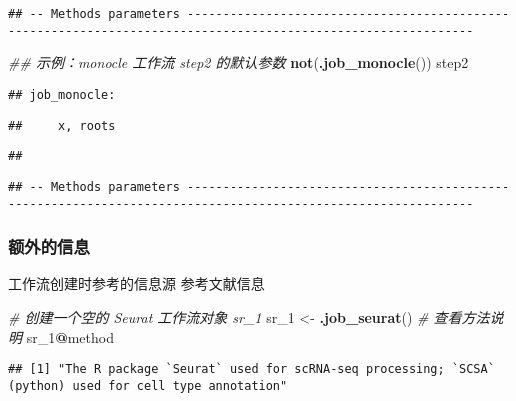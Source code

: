 \documentclass[
]{article}
\newenvironment{Shaded}{\begin{snugshade}}{\end{snugshade}}
\newcommand{\CommentTok}[1]{\textcolor[rgb]{0.56,0.35,0.01}{\textit{#1}}}
\newcommand{\DecValTok}[1]{\textcolor[rgb]{0.00,0.00,0.81}{#1}}
\newcommand{\KeywordTok}[1]{\textcolor[rgb]{0.13,0.29,0.53}{\textbf{#1}}}
\newcommand{\NormalTok}[1]{#1}
\newcommand{\OperatorTok}[1]{\textcolor[rgb]{0.81,0.36,0.00}{\textbf{#1}}}
\newcommand{\StringTok}[1]{\textcolor[rgb]{0.31,0.60,0.02}{#1}}
\begin{document}
\begin{verbatim}
## -- Methods parameters --------------------------------------------------------------------------------------------------------------
\end{verbatim}

\begin{Shaded}
\begin{Highlighting}[]
\CommentTok{\#\# 示例：monocle 工作流 step2 的默认参数}
\KeywordTok{not}\NormalTok{(}\KeywordTok{.job\_monocle}\NormalTok{())}
\NormalTok{step2}
\end{Highlighting}
\end{Shaded}

\begin{verbatim}
## job_monocle:
\end{verbatim}

\begin{verbatim}
##     x, roots
\end{verbatim}

\begin{verbatim}
## 
\end{verbatim}

\begin{verbatim}
## -- Methods parameters --------------------------------------------------------------------------------------------------------------
\end{verbatim}

\hypertarget{ux989dux5916ux7684ux4fe1ux606f}{%
\subsubsection{额外的信息}\label{ux989dux5916ux7684ux4fe1ux606f}}

工作流创建时参考的信息源
参考文献信息

\begin{Shaded}
\begin{Highlighting}[]
\CommentTok{\# 创建一个空的 Seurat 工作流对象 \textquotesingle{}sr\_1\textquotesingle{}}
\NormalTok{sr\_}\DecValTok{1}\NormalTok{ \textless{}{-}}\StringTok{ }\KeywordTok{.job\_seurat}\NormalTok{()}
\CommentTok{\# 查看方法说明}
\NormalTok{sr\_}\DecValTok{1}\OperatorTok{@}\NormalTok{method}
\end{Highlighting}
\end{Shaded}

\begin{verbatim}
## [1] "The R package `Seurat` used for scRNA-seq processing; `SCSA` (python) used for cell type annotation"
\end{verbatim}
\end{document}
